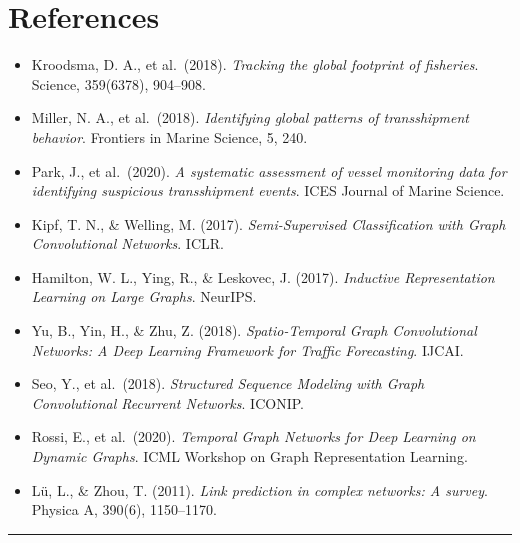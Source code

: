 \documentclass[
]{article}
\providecommand{\tightlist}{%
  \setlength{\itemsep}{0pt}\setlength{\parskip}{0pt}}
\begin{document}
\clearpage

\section*{References}\label{references}

\begin{itemize}
\tightlist
\item
  Kroodsma, D. A., et al.~(2018). \emph{Tracking the global footprint of
  fisheries}. Science, 359(6378), 904--908.\\
\item
  Miller, N. A., et al.~(2018). \emph{Identifying global patterns of
  transshipment behavior}. Frontiers in Marine Science, 5, 240.\\
\item
  Park, J., et al.~(2020). \emph{A systematic assessment of vessel
  monitoring data for identifying suspicious transshipment events}. ICES
  Journal of Marine Science.\\
\item
  Kipf, T. N., \& Welling, M. (2017). \emph{Semi-Supervised
  Classification with Graph Convolutional Networks}. ICLR.\\
\item
  Hamilton, W. L., Ying, R., \& Leskovec, J. (2017). \emph{Inductive
  Representation Learning on Large Graphs}. NeurIPS.\\
\item
  Yu, B., Yin, H., \& Zhu, Z. (2018). \emph{Spatio-Temporal Graph
  Convolutional Networks: A Deep Learning Framework for Traffic
  Forecasting}. IJCAI.\\
\item
  Seo, Y., et al.~(2018). \emph{Structured Sequence Modeling with Graph
  Convolutional Recurrent Networks}. ICONIP.\\
\item
  Rossi, E., et al.~(2020). \emph{Temporal Graph Networks for Deep
  Learning on Dynamic Graphs}. ICML Workshop on Graph Representation
  Learning.\\
\item
  Lü, L., \& Zhou, T. (2011). \emph{Link prediction in complex networks:
  A survey}. Physica A, 390(6), 1150--1170.
\end{itemize}

\begin{center}\rule{0.5\linewidth}{0.5pt}\end{center}
\end{document}
